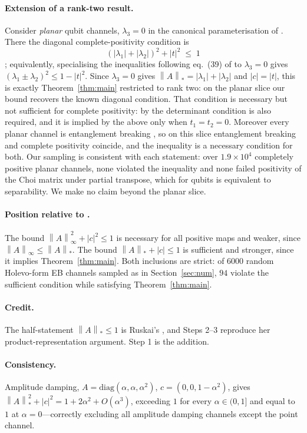 \documentclass[11pt,a4paper]{article}
\theoremstyle{remark}
\newcommand{\nuc}[1]{\left\lVert #1 \right\rVert_{*}}
\newcommand{\opn}[1]{\left\lVert #1 \right\rVert_{\infty}}
\begin{document}
\paragraph{Extension of a rank-two result.} Consider \emph{planar} qubit channels, $\lambda_3=0$ in the canonical parameterisation of \cite{FA1999,RSW2002}. There the diagonal complete-positivity condition is
\[
(|\lambda_1|+|\lambda_2|)^2 + |t|^2 \;\le\; 1
\]
\cite[eq.~(23)]{Ruskai2003}; equivalently, specialising the inequalities following eq.~(39) of \cite{RSW2002} to $\lambda_3=0$ gives $(\lambda_1\pm\lambda_2)^2\le 1-|t|^2$. Since $\lambda_3=0$ gives $\nuc{A}=|\lambda_1|+|\lambda_2|$ and $|c|=|t|$, this is exactly Theorem~\ref{thm:main} restricted to rank two: on the planar slice our bound recovers the known diagonal condition. That condition is necessary but not sufficient for complete positivity: by \cite[Cor.\ 2]{RSW2002} the determinant condition is also required, and it is implied by the above only when $t_1=t_2=0$. Moreover every planar channel is entanglement breaking \cite[Sec.~5]{Ruskai2003}, so on this slice entanglement breaking and complete positivity coincide, and the inequality is a necessary condition for both. Our sampling is consistent with each statement: over $1.9\times10^4$ completely positive planar channels, none violated the inequality and none failed positivity of the Choi matrix under partial transpose, which for qubits is equivalent to separability. We make no claim beyond the planar slice.

\paragraph{Position relative to \cite{LamiGiovannetti}.} The bound $\opn{A}^2+|c|^2\le1$ is necessary for all positive maps and weaker, since $\opn{A}\le\nuc{A}$. The bound $\nuc{A}+|c|\le1$ is sufficient and stronger, since it implies Theorem~\ref{thm:main}. Both inclusions are strict: of $6000$ random Holevo-form EB channels sampled as in Section~\ref{sec:num}, $94$ violate the sufficient condition while satisfying Theorem~\ref{thm:main}.

\paragraph{Credit.} The half-statement $\nuc{A}\le1$ is Ruskai's \cite{Ruskai2003}, and Steps 2--3 reproduce her product-representation argument. Step 1 is the addition.

\paragraph{Consistency.} Amplitude damping, $A=\mathrm{diag}(\alpha,\alpha,\alpha^2)$, $c=(0,0,1-\alpha^2)$, gives $\nuc{A}^2+|c|^2 = 1+2\alpha^2+O(\alpha^3)$, exceeding $1$ for every $\alpha\in(0,1]$ and equal to $1$ at $\alpha=0$---correctly excluding all amplitude damping channels except the point channel.
\end{document}
